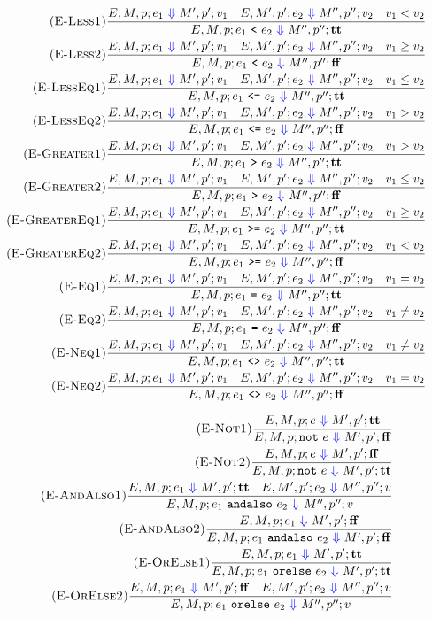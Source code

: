 \documentclass{article}
\newcommand{\btt}{\mathbf{tt}}
\newcommand{\bff}{\mathbf{ff}}
\newcommand{\To}{\ \textcolor{blue}{\Downarrow}\ }
\begin{document}
\begin{align*}
\tag{\sc E-Less1}
\frac{E,M,p;e_1\To M',p';v_1 \quad E,M',p';e_2\To M'',p'';v_2 \quad v_1<v_2}
{E,M,p;e_1\ \texttt{<}\ e_2\To M'',p'';\btt}
\\
\tag{\sc E-Less2}
\frac{E,M,p;e_1\To M',p';v_1 \quad E,M',p';e_2\To M'',p'';v_2 \quad v_1\ge v_2}
{E,M,p;e_1\ \texttt{<}\ e_2\To M'',p'';\bff}
\\
\tag{\sc E-LessEq1}
\frac{E,M,p;e_1\To M',p';v_1 \quad E,M',p';e_2\To M'',p'';v_2 \quad v_1\le v_2}
{E,M,p;e_1\ \texttt{<=}\ e_2\To M'',p'';\btt}
\\
\tag{\sc E-LessEq2}
\frac{E,M,p;e_1\To M',p';v_1 \quad E,M',p';e_2\To M'',p'';v_2 \quad v_1>v_2}
{E,M,p;e_1\ \texttt{<=}\ e_2\To M'',p'';\bff}
\\
\tag{\sc E-Greater1}
\frac{E,M,p;e_1\To M',p';v_1 \quad E,M',p';e_2\To M'',p'';v_2 \quad v_1>v_2}
{E,M,p;e_1\ \texttt{>}\ e_2\To M'',p'';\btt}
\\
\tag{\sc E-Greater2}
\frac{E,M,p;e_1\To M',p';v_1 \quad E,M',p';e_2\To M'',p'';v_2 \quad v_1\le v_2}
{E,M,p;e_1\ \texttt{>}\ e_2\To M'',p'';\bff}
\\
\tag{\sc E-GreaterEq1}
\frac{E,M,p;e_1\To M',p';v_1 \quad E,M',p';e_2\To M'',p'';v_2 \quad v_1\ge v_2}
{E,M,p;e_1\ \texttt{>=}\ e_2\To M'',p'';\btt}
\\
\tag{\sc E-GreaterEq2}
\frac{E,M,p;e_1\To M',p';v_1 \quad E,M',p';e_2\To M'',p'';v_2 \quad v_1<v_2}
{E,M,p;e_1\ \texttt{>=}\ e_2\To M'',p'';\bff}
\\
\tag{\sc E-Eq1}
\frac{E,M,p;e_1\To M',p';v_1 \quad E,M',p';e_2\To M'',p'';v_2 \quad v_1=v_2}
{E,M,p;e_1\ \texttt{=}\ e_2\To M'',p'';\btt}
\\
\tag{\sc E-Eq2}
\frac{E,M,p;e_1\To M',p';v_1 \quad E,M',p';e_2\To M'',p'';v_2 \quad v_1\ne v_2}
{E,M,p;e_1\ \texttt{=}\ e_2\To M'',p'';\bff}
\\
\tag{\sc E-Neq1}
\frac{E,M,p;e_1\To M',p';v_1 \quad E,M',p';e_2\To M'',p'';v_2 \quad v_1\ne v_2}
{E,M,p;e_1\ \texttt{<>}\ e_2\To M'',p'';\btt}
\\
\tag{\sc E-Neq2}
\frac{E,M,p;e_1\To M',p';v_1 \quad E,M',p';e_2\To M'',p'';v_2 \quad v_1=v_2}
{E,M,p;e_1\ \texttt{<>}\ e_2\To M'',p'';\bff}
\end{align*}

\begin{align*}
\tag{\sc E-Not1}
\frac{E,M,p;e\To M',p';\btt}
{E,M,p;\texttt{not}\ e\To M',p';\bff}
\\
\tag{\sc E-Not2}
\frac{E,M,p;e\To M',p';\bff}
{E,M,p;\texttt{not}\ e\To M',p';\btt}
\\
\tag{\sc E-AndAlso1}
\frac{E,M,p;e_1\To M',p';\btt \quad E,M',p';e_2\To M'',p'';v}
{E,M,p;e_1\ \texttt{andalso}\ e_2\To M'',p'';v}
\\
\tag{\sc E-AndAlso2}
\frac{E,M,p;e_1\To M',p';\bff}
{E,M,p;e_1\ \texttt{andalso}\ e_2\To M',p';\bff}
\\
\tag{\sc E-OrElse1}
\frac{E,M,p;e_1\To M',p';\btt}
{E,M,p;e_1\ \texttt{orelse}\ e_2\To M',p';\btt}
\\
\tag{\sc E-OrElse2}
\frac{E,M,p;e_1\To M',p';\bff \quad E,M',p';e_2\To M'',p'';v}
{E,M,p;e_1\ \texttt{orelse}\ e_2\To M'',p'';v}
\end{align*}
\end{document}
